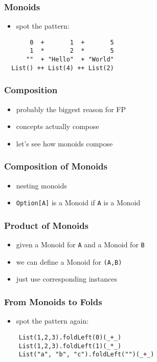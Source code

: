 \documentclass[aspectratio=169]{beamer}
\begin{document}
\begin{frame}
  \frametitle{Monoids}
  \begin{itemize}
  \item spot the pattern:
  \end{itemize}
  \begin{verbatim}
       0  +       1  +       5
       1  *       2  *       5
      ""  + "Hello"  + "World"
  List() ++ List(4) ++ List(2)
  \end{verbatim}
\end{frame}

\begin{frame}
  \frametitle{Composition}
  \begin{itemize}
  \item probably the biggest reason for FP
  \item concepts actually compose
  \item let's see how monoids compose
  \end{itemize}
\end{frame}

\begin{frame}
  \frametitle{Composition of Monoids}
  \begin{itemize}
  \item nesting monoids
  \item \texttt{Option[A]} is a Monoid if \texttt{A} is a Monoid
  \end{itemize}
\end{frame}

\begin{frame}
  \frametitle{Product of Monoids}
  \begin{itemize}
  \item given a Monoid for \texttt{A} and a Monoid for \texttt{B}
  \item we can define a Monoid for \texttt{(A,B)}
  \item just use corresponding instances
  \end{itemize}
\end{frame}

\begin{frame}
  \frametitle{From Monoids to Folds}
  \begin{itemize}
  \item spot the pattern again:
  \end{itemize}
  \begin{verbatim}
    List(1,2,3).foldLeft(0)(_+_)
    List(1,2,3).foldLeft(1)(_*_)
    List("a", "b", "c").foldLeft("")(_+_)
  \end{verbatim}
\end{frame}
\end{document}
